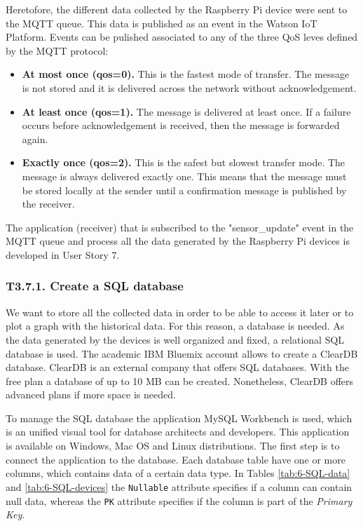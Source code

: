 Heretofore, the different data collected by the Raspberry Pi device were sent to the MQTT queue. This data is published as an event in the Watson \ac{IoT} Platform. Events can be pulished associated to any of the three \ac{QoS} leves defined by the MQTT protocol:
\begin{itemize}
	\item \textbf{At most once (qos=0).} This is the fastest mode of transfer. The message is not stored and it is delivered across the network without acknowledgement.
	\item \textbf{At least once (qos=1).} The message is delivered at least once. If a failure occurs before acknowledgement is received, then the message is forwarded again.
	\item \textbf{Exactly once (qos=2).} This is the safest but slowest transfer mode. The message is always delivered exactly one. This means that the message must be stored locally at the sender until a confirmation message is published by the receiver.
\end{itemize}

The application (receiver) that is subscribed to the "sensor\_update" event in the MQTT queue and process all the data generated by the Raspberry Pi devices is developed in User Story 7.


\subsubsection{T3.7.1. Create a SQL database}

We want to store all the collected data in order to be able to access it later or to plot a graph with the historical data. For this reason, a database is needed. As the data generated by the devices is well organized and fixed, a relational SQL database is used. The academic IBM Bluemix account allows to create a ClearDB database. ClearDB is an external company that offers SQL databases. With the free plan a database of up to 10 MB can be created. Nonetheless, ClearDB offers advanced plans if more space is needed.

To manage the SQL database the application MySQL Workbench is used, which is an unified visual tool for database architects and developers. This application is available on Windows, Mac OS and Linux distributions. The first step is to connect the application to the database. Each database table have one or more columns, which contains data of a certain data type. In Tables \ref{tab:6-SQL-data} and \ref{tab:6-SQL-devices} the \texttt{Nullable} attribute specifies if a column can contain null data, whereas the \texttt{PK} attribute specifies if the column is part of the \textit{Primary Key}.

